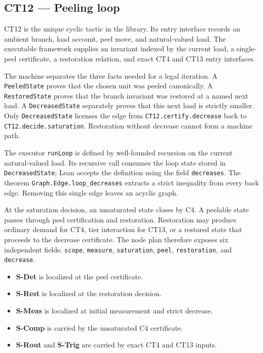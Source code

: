 \subsection{CT12 --- Peeling loop}\label{ct:12}\label{peeling-loops-closure-by-well-founded-recursion}

CT12 is the unique cyclic tactic in the library.  Its entry interface records
an ambient branch, load account, peel move, and natural-valued load.  The
executable framework supplies an invariant indexed by the current load, a
single-peel certificate, a restoration relation, and exact CT4 and CT13 entry
interfaces.

The machine separates the three facts needed for a legal iteration.  A
\texttt{PeeledState} proves that the chosen unit was peeled canonically.  A
\texttt{RestoredState} proves that the branch invariant was restored at a
named next load.  A \texttt{DecreasedState} separately proves that this next
load is strictly smaller.  Only \texttt{DecreasedState} licenses the edge from
\texttt{CT12.certify.decrease} back to
\texttt{CT12.decide.saturation}.  Restoration without decrease cannot form a
machine path.

The executor \texttt{runLoop} is defined by well-founded recursion on the
current natural-valued load.  Its recursive call consumes the loop state stored
in \texttt{DecreasedState}; Lean accepts the definition using the field
\texttt{decreases}.  The theorem
\texttt{Graph.Edge.loop\_decreases} extracts a strict inequality from every
back edge.  Removing this single edge leaves an acyclic graph.

At the saturation decision, an unsaturated state closes by C4.  A peelable
state passes through peel certification and restoration.  Restoration may
produce ordinary demand for CT4, tier interaction for CT13, or a restored state
that proceeds to the decrease certificate.  The node plan therefore exposes
six independent fields: \texttt{scope}, \texttt{measure},
\texttt{saturation}, \texttt{peel}, \texttt{restoration}, and
\texttt{decrease}.

\begin{itemize}
\tightlist
\item \textbf{S-Det} is localized at the peel certificate.
\item \textbf{S-Rest} is localized at the restoration decision.
\item \textbf{S-Meas} is localized at initial measurement and strict decrease.
\item \textbf{S-Comp} is carried by the unsaturated C4 certificate.
\item \textbf{S-Rout} and \textbf{S-Trig} are carried by exact CT4 and CT13 inputs.
\end{itemize}


